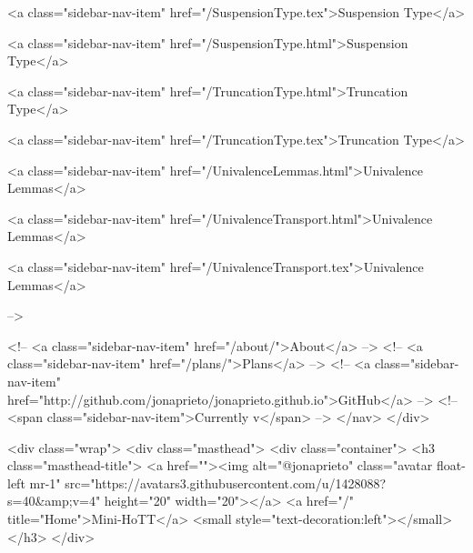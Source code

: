       
    
      
        
          <a class="sidebar-nav-item" href="/SuspensionType.tex">Suspension Type</a>
        
      
    
      
        
          <a class="sidebar-nav-item" href="/SuspensionType.html">Suspension Type</a>
        
      
    
      
        
          <a class="sidebar-nav-item" href="/TruncationType.html">Truncation Type</a>
        
      
    
      
        
          <a class="sidebar-nav-item" href="/TruncationType.tex">Truncation Type</a>
        
      
    
      
        
          <a class="sidebar-nav-item" href="/UnivalenceLemmas.html">Univalence Lemmas</a>
        
      
    
      
        
          <a class="sidebar-nav-item" href="/UnivalenceTransport.html">Univalence Lemmas</a>
        
      
    
      
        
          <a class="sidebar-nav-item" href="/UnivalenceTransport.tex">Univalence Lemmas</a>
        
      
     -->

    <!-- <a class="sidebar-nav-item" href="/about/">About</a> -->
    <!-- <a class="sidebar-nav-item" href="/plans/">Plans</a> -->
    <!-- <a class="sidebar-nav-item" href="http://github.com/jonaprieto/jonaprieto.github.io">GitHub</a> -->
    <!-- <span class="sidebar-nav-item">Currently v</span> -->
  </nav>
</div>

    <div class="wrap">
      <div class="masthead">
        <div class="container">
          <h3 class="masthead-title">
            <a href=""><img alt="@jonaprieto" class="avatar float-left mr-1" src="https://avatars3.githubusercontent.com/u/1428088?s=40&amp;v=4" height="20" width="20"></a>
            <a href="/" title="Home">Mini-HoTT</a>
            <small style="text-decoration:left"></small>
          </h3>
        </div>
      
